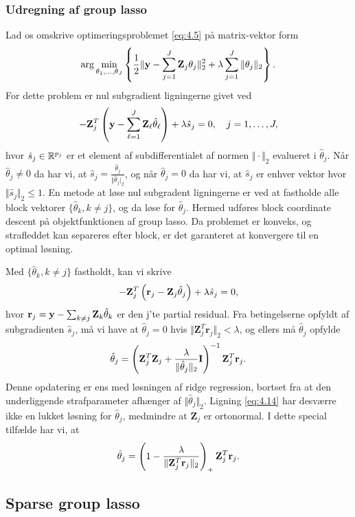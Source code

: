 \subsubsection{Udregning af group lasso}
Lad os omskrive optimeringsproblemet \eqref{eq:4.5} på matrix-vektor form
\begin{align*}
\arg \min_{\theta_1, \ldots, \theta_J} \cbr{\frac{1}{2} \Vert \y - \sum_{j=1}^J \mathbf{Z}_{j} \theta_j \Vert_2^2 + \lambda \sum_{j=1}^J \Vert \theta_j \Vert_2}.
\end{align*}
For dette problem er nul subgradient ligningerne givet ved
\begin{align*}
- \mathbf{Z}_{j}^T \del{\y - \sum_{\ell=1}^J \mathbf{Z}_\ell \hat{\theta}_\ell} + \lambda \hat{s}_j = 0, \quad j=1,\ldots, J,
\end{align*} 
hvor $\hat{s}_j \in \mathbb{R}^{p_j}$ er et element af subdifferentialet af normen $\Vert \cdot \Vert_2$ evalueret i $\hat{\theta}_j$.
Når $\hat{\theta}_j \neq 0$ da har vi, at $\hat{s}_j = \frac{\hat{\theta}_j}{\Vert \hat{\theta}_j \vert_2}$, og når $\hat{\theta}_j=0$ da har vi, at $\hat{s}_j$ er enhver vektor hvor $\Vert \hat{s}_j \Vert_2 \leq 1$.
En metode at løse nul subgradent ligningerne er ved at fastholde alle block vektorer $\{\hat{\theta}_k, k \neq j\}$, og da løse for $\hat{\theta}_j$.
Hermed udføres block coordinate descent på objektfunktionen af group lasso.
Da problemet er konveks, og strafleddet kan separeres efter block, er det garanteret at konvergere til en optimal løsning.

Med $\{\hat{\theta}_k, k \neq j\}$ fastholdt, kan vi skrive
\begin{align*}
- \mathbf{Z}_{j}^T \del{\mathbf{r}_j - \mathbf{Z}_j \hat{\theta}_j} + \lambda \hat{s}_j = 0,
\end{align*}
hvor $\mathbf{r}_j = \mathbf{y} - \sum_{k \neq j} \mathbf{Z}_k \hat{\theta}_k $ er den j'te partial residual.
Fra betingelserne opfyldt af subgradienten $\hat{s}_j$, må vi have at $\hat{\theta}_j =0$ hvis $\Vert \mathbf{Z}_j^T \mathbf{r}_j \Vert_2 < \lambda$, og ellers må $\hat{\theta}_j$ opfylde
\begin{align}
\hat{\theta}_j = \del{\mathbf{Z}_j^T \mathbf{Z}_j + \frac{\lambda}{\Vert \hat{\theta}_j \Vert_2} \mathbf{I}}^{-1} \mathbf{Z}_j^T \mathbf{r}_j. \label{eq:4.14}
\end{align}
Denne opdatering er ens med løsningen af ridge regression, bortset fra at den underliggende strafparameter afhænger af $\Vert \hat{\theta}_j \Vert_2$.
Ligning \eqref{eq:4.14} har desværre ikke en lukket løsning for $\hat{\theta}_j$, medmindre at $\mathbf{Z}_j$ er ortonormal. I dette special tilfælde har vi, at
\begin{align*}
\hat{\theta}_j = \del{1 - \frac{\lambda}{\Vert \mathbf{Z}_j^T \mathbf{r}_j \Vert_2}}_+  \mathbf{Z}_j^T \mathbf{r}_j.
\end{align*}

\subsection{Sparse group lasso}

\newpage